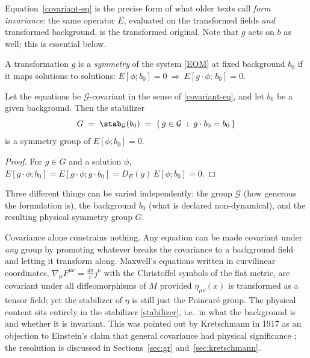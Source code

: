 Equation~\eqref{covariant-eq} is the precise form of what older texts call
\emph{form invariance}: the same operator $E$, evaluated on the transformed
fields \emph{and} transformed background, is the transformed original. Note that
$g$ acts on $b$ as well; this is essential below.

\begin{definition}\label{def:symmetry}
A transformation $g$ is a \emph{symmetry} of the system \eqref{EOM} at
fixed background $b_0$ if it maps solutions to solutions:
$E[\phi;b_0]=0\ \Rightarrow\ E[g\cdot\phi;\,b_0]=0$.
\end{definition}

\begin{proposition}[Covariance $+$ invariance of the background $=$ symmetry]
\label{prop:main}
Let the equations be $\mathcal G$-covariant in the sense of
\eqref{covariant-eq}, and let $b_0$ be a given background. Then the
stabilizer
\begin{equation}\label{stabilizer}
  G \;=\; \stab_{\mathcal G}(b_0)\;=\;\{\,g\in\mathcal G\;:\; g\cdot b_0=b_0\,\}
\end{equation}
is a symmetry group of $E[\phi;b_0]=0$.
\end{proposition}
\begin{proof}
For $g\in G$ and a solution $\phi$,
$E[g\cdot\phi;b_0]=E[g\cdot\phi;g\cdot b_0]=D_E(g)\,E[\phi;b_0]=0.$
\end{proof}

 Three different things
can be varied independently: the group $\mathcal G$ (how generous the
formulation is), the background $b_0$ (what is declared non-dynamical), and
the resulting physical symmetry group $G$.

\begin{remark}\label{rem:kretschmann}
Covariance alone constrains nothing. Any equation can be made covariant under
\emph{any} group by promoting whatever breaks the covariance to a background
field and letting it transform along. Maxwell's equations written in
curvilinear coordinates, $\nabla_\mu F^{\mu\nu}=\tfrac{4\pi}{c}j^\nu$ with
the Christoffel symbols of the flat metric, are covariant under all
diffeomorphisms of $M$ provided $\eta_{\mu\nu}(x)$ is transformed as a
tensor field; yet the stabilizer of $\eta$ is still just the Poincar\'e
group. The physical content sits entirely in the stabilizer \eqref{stabilizer},
i.e.\ in what the background is and whether it is invariant. This was pointed
out by Kretschmann in 1917 as an objection to Einstein's claim that general
covariance had physical significance \cite{kretschmann,norton}; the resolution
is discussed in Sections~\ref{sec:gr} and~\ref{sec:kretschmann}.
\end{remark}

